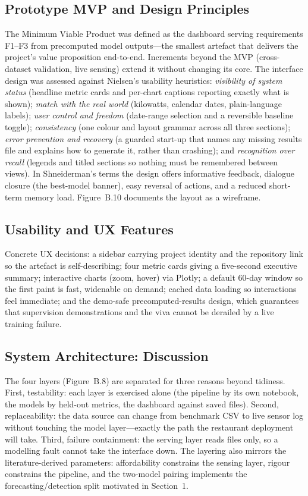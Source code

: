 \documentclass[11pt,a4paper]{article}
\begin{document}
\subsection{Prototype MVP and Design Principles}
The Minimum Viable Product was defined as the dashboard serving requirements
F1--F3 from precomputed model outputs---the smallest artefact that delivers the
project's value proposition end-to-end. Increments beyond the MVP (cross-dataset
validation, live sensing) extend it without changing its core. The interface
design was assessed against Nielsen's usability heuristics: \emph{visibility of
system status} (headline metric cards and per-chart captions reporting exactly
what is shown); \emph{match with the real world} (kilowatts, calendar dates,
plain-language labels); \emph{user control and freedom} (date-range selection
and a reversible baseline toggle); \emph{consistency} (one colour and layout
grammar across all three sections); \emph{error prevention and recovery} (a
guarded start-up that names any missing results file and explains how to
generate it, rather than crashing); and \emph{recognition over recall} (legends
and titled sections so nothing must be remembered between views). In
Shneiderman's terms the design offers informative feedback, dialogue closure
(the best-model banner), easy reversal of actions, and a reduced short-term
memory load. Figure~B.10 documents the layout as a wireframe.

\subsection{Usability and UX Features}
Concrete UX decisions: a sidebar carrying project identity and the repository
link so the artefact is self-describing; four metric cards giving a five-second
executive summary; interactive charts (zoom, hover) via Plotly; a default
60-day window so the first paint is fast, widenable on demand; cached data
loading so interactions feel immediate; and the demo-safe precomputed-results
design, which guarantees that supervision demonstrations and the viva cannot be
derailed by a live training failure.

\subsection{System Architecture: Discussion}
The four layers (Figure~B.8) are separated for three reasons beyond tidiness.
First, testability: each layer is exercised alone (the pipeline by its own
notebook, the models by held-out metrics, the dashboard against saved files).
Second, replaceability: the data source can change from benchmark CSV to live
sensor log without touching the model layer---exactly the path the restaurant
deployment will take. Third, failure containment: the serving layer reads files
only, so a modelling fault cannot take the interface down. The layering also
mirrors the literature-derived parameters: affordability constrains the sensing
layer, rigour constrains the pipeline, and the two-model pairing implements the
forecasting/detection split motivated in Section~1.
\end{document}
